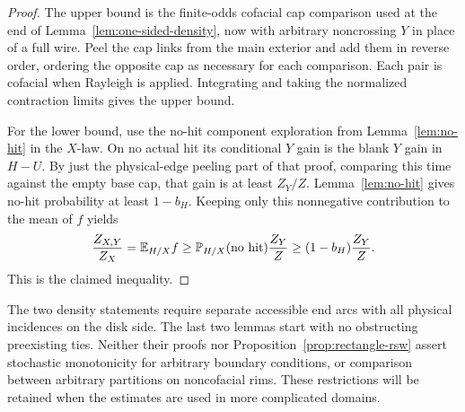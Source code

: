 \begin{proof}
The upper bound is the finite-odds cofacial cap comparison used at
the end of Lemma~\ref{lem:one-sided-density}, now with arbitrary
noncrossing $Y$ in place of a full wire.  Peel the cap links from
the main exterior and add them in reverse order, ordering the
opposite cap as necessary for each comparison.  Each pair is
cofacial when Rayleigh is applied.  Integrating and taking the
normalized contraction limits gives the upper bound.

For the lower bound, use the no-hit component exploration from
Lemma~\ref{lem:no-hit} in the $X$-law.  On no actual hit its
conditional $Y$ gain is the blank $Y$ gain in $H-U$.  By just the
physical-edge peeling part of that proof, comparing this time
against the empty base cap, that gain is at least $Z_Y/Z$.
Lemma~\ref{lem:no-hit} gives no-hit probability at least $1-b_H$.
Keeping only this nonnegative contribution to the mean of $f$ yields
\[
 \frac{Z_{X,Y}}{Z_X}=\mathbb E_{H/X}f
 \ge\mathbb P_{H/X}(\text{no hit})\frac{Z_Y}{Z}
 \ge(1-b_H)\frac{Z_Y}{Z}.
\]
This is the claimed inequality.
\end{proof}

\begin{remark}
\label{rect:scope}
The two density statements require separate accessible end arcs with
all physical incidences on the disk side.  The last two lemmas start
with no obstructing preexisting ties.  Neither their proofs nor
Proposition~\ref{prop:rectangle-rsw} assert stochastic monotonicity
for arbitrary boundary conditions, or comparison between arbitrary
partitions on noncofacial rims.  These restrictions will be retained
when the estimates are used in more complicated domains.
\end{remark}
